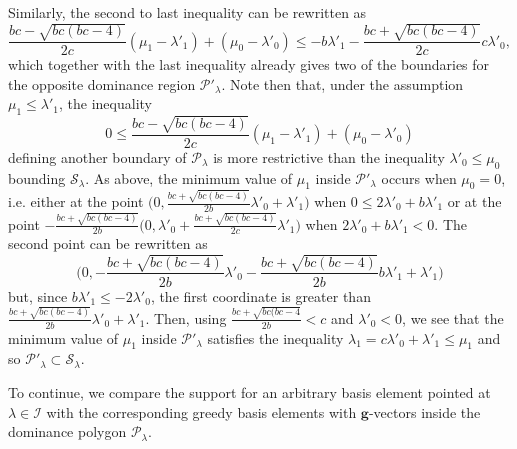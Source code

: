 \documentclass{amsart}
\numberwithin{theorem}{section}
\newcommand{\bfg}{\boldsymbol{g}}
\newcommand{\cI}{\mathcal{I}}
\newcommand{\cP}{\mathcal{P}}
\newcommand{\cS}{\mathcal{S}}
\begin{document}
  Similarly, the second to last inequality can be rewritten as
  \[ \frac{b c-\sqrt{b c (b c-4)}}{2 c}(\mu_1-\lambda'_1)+(\mu_0-\lambda'_0) \leq -b\lambda'_1-\frac{b c+\sqrt{b c (b c-4)}}{2c}c\lambda'_0,\]
  which together with the last inequality already gives two of the boundaries for the opposite dominance region $\cP'_\lambda$.
  Note then that, under the assumption $\mu_1\leq\lambda'_1$, the inequality
  \[ 0 \leq \frac{b c-\sqrt{b c (b c-4)}}{2 c}(\mu_1-\lambda'_1)+(\mu_0-\lambda'_0) \]
  defining another boundary of $\cP_\lambda$ is more restrictive than the inequality $\lambda'_0\leq\mu_0$ bounding $\cS_\lambda$.
  As above, the minimum value of $\mu_1$ inside $\cP'_\lambda$ occurs when $\mu_0=0$, i.e. either at the point $\big(0, \frac{bc+\sqrt{bc(bc-4)}}{2b}\lambda'_0+\lambda'_1 \big)$
  when $0 \leq 2\lambda'_0+b\lambda'_1$ or at the point $-\frac{bc+\sqrt{bc(bc-4)}}{2b} \big(0, \lambda'_0+\frac{bc+\sqrt{bc(bc-4)}}{2c}\lambda'_1 \big)$
  when $2\lambda'_0+b\lambda'_1<0$.
  The second point can be rewritten as
  \[\big(0, -\frac{bc+\sqrt{bc(bc-4)}}{2b} \lambda'_0-\frac{bc+\sqrt{bc(bc-4)}}{2b} b\lambda'_1+\lambda'_1 \big)\]
  but, since $b\lambda'_1\le -2\lambda'_0$, the first coordinate is greater than $\frac{bc+\sqrt{bc(bc-4)}}{2b}\lambda'_0+\lambda'_1$.
  Then, using $\frac{bc+\sqrt{bc(bc-4}}{2b}<c$ and $\lambda'_0<0$, we see that the minimum value of $\mu_1$ inside $\cP'_\lambda$ satisfies the inequality $\lambda_1=c\lambda'_0+\lambda'_1\le\mu_1$ and so $\cP'_\lambda\subset\cS_\lambda$.

  To continue, we compare the support for an arbitrary basis element pointed at $\lambda\in\cI$ with the corresponding greedy basis elements with $\bfg$-vectors inside the dominance polygon $\cP_\lambda$.
\end{document}
